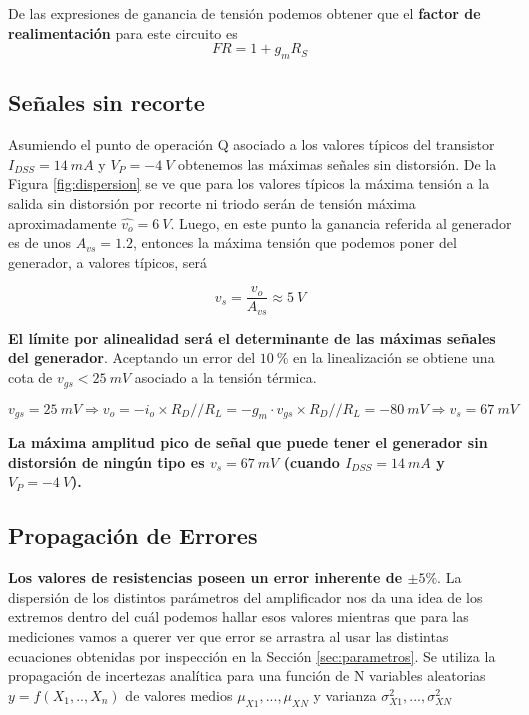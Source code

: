 \documentclass[a4paper, 10pt, spanish]{article}
\begin{document}
De las expresiones de ganancia de tensión podemos obtener que el \textbf{factor de realimentación} para este circuito es
\begin{equation}
	FR = 1+g_mR_S
	\end{equation}

\subsection{Señales sin recorte}\label{sec:distorsiones}

Asumiendo el punto de operación Q asociado a los valores típicos del transistor $I_{DSS} = 14\ mA$ y $V_P = -4\ V$ obtenemos las máximas señales sin distorsión. De la Figura \ref{fig:dispersion} se ve que para los valores típicos la máxima tensión a la salida sin distorsión por recorte ni triodo serán de tensión máxima aproximadamente $\hat{v_o} = 6\ V$. Luego, en este punto la ganancia referida al generador es de unos $A_{vs} = 1.2$, entonces la máxima tensión que podemos poner del generador, a valores típicos, será

\begin{equation}
	v_s = \frac{v_o}{A_{vs}} \approx 5\ V \nonumber
	\end{equation}

\textbf{El límite por alinealidad será el determinante de las máximas señales del generador}. Aceptando un error del $10\ \%$ en la linealización se obtiene una cota de $v_{gs} < 25\ mV$ asociado a la tensión térmica.

\begin{equation}
	v_{gs} = 25\ mV \Rightarrow v_o = -i_o\times R_D//R_L = -g_m\cdot v_{gs} \times R_D//R_L = - 80\ mV \Rightarrow v_s = 67\ mV
	\end{equation}

\textbf{La máxima amplitud pico de señal que puede tener el generador sin distorsión de ningún tipo es $v_s = 67\ mV$ (cuando $I_{DSS} = 14\ mA$ y $V_P = -4\ V$).}


\subsection{Propagación de Errores}

\textbf{Los valores de resistencias poseen un error inherente de $\pm 5 \%$}. La dispersión de los distintos parámetros del amplificador nos da una idea de los extremos dentro del cuál podemos hallar esos valores mientras que para las mediciones vamos a querer ver que error se arrastra al usar las distintas ecuaciones obtenidas por inspección en la Sección \ref{sec:parametros}. Se utiliza la propagación de incertezas analítica para una función de N variables aleatorias $y=f(X_1,..,X_n)$ de valores medios $\mu_{X1},...,\mu_{XN}$ y varianza $\sigma_{X1}^2,...,\sigma_{XN}^2$
\end{document}
